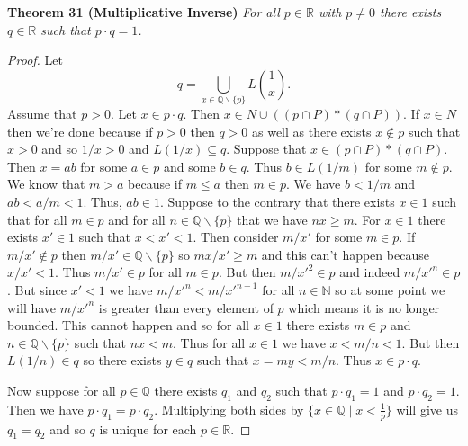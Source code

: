 \documentclass{article}
\begin{document}
\begin{flushleft}
\textbf{Theorem 31 (Multiplicative Inverse)}
\textsl{For all $p \in \mathbb{R}$ with $p \neq 0$ there exists $q \in \mathbb{R}$ such that $p \cdot q = 1$.}
\begin{proof}
Let
\[
q = \bigcup_{x \in \mathbb{Q}\backslash \{p\}} L(\frac{1}{x}).
\]
Assume that $p>0$. Let $x \in p \cdot q$. Then $x \in N \cup ((p \cap P) * (q \cap P))$. If $x \in N$ then we're done because if $p>0$ then $q>0$ as well as there exists $x \notin p$ such that $x>0$ and so $1/x>0$ and $L(1/x) \subseteq q$. Suppose that $x \in (p \cap P) * (q \cap P)$. Then $x=ab$ for some $a \in p$ and some $b \in q$. Thus $b \in L(1/m)$ for some $m \notin p$. We know that $m>a$ because if $m\leq a$ then $m \in p$. We have $b<1/m$ and $ab < a/m < 1$. Thus, $ab \in 1$. Suppose to the contrary that there exists $x \in 1$ such that for all $m \in p$ and for all $n \in \mathbb{Q} \backslash \{p\}$ that we have $nx \geq m$. For $x \in 1$ there exists $x' \in 1$ such that $x < x' < 1$. Then consider $m/x'$ for some $m \in p$. If $m/x' \notin p$ then $m/x' \in \mathbb{Q} \backslash \{p\}$ so $mx/x' \geq m$ and this can't happen because $x/x' < 1$. Thus $m/x' \in p$ for all $m \in p$. But then $m/x'^2 \in p$ and indeed $m/x'^n \in p$. But since $x'<1$ we have $m/x'^n < m/x'^{n+1}$ for all $n \in \mathbb{N}$ so at some point we will have $m/x'^n$ is greater than every element of $p$ which means it is no longer bounded. This cannot happen and so for all $x \in 1$ there exists $m \in p$ and $n \in \mathbb{Q} \backslash \{p\}$ such that $nx < m$. Thus for all $x \in 1$ we have $x < m/n < 1$. But then $L(1/n) \in q$ so there exists $y \in q$ such that $x = my < m/n$. Thus $x \in p \cdot q$.
\newline

Now suppose for all $p \in \mathbb{Q}$ there exists $q_1$ and $q_2$ such that $p \cdot q_1 = 1$ and $p \cdot q_2= 1$. Then we have $p \cdot q_1=p \cdot q_2$. Multiplying both sides by $\{x \in \mathbb{Q} \mid x<\frac{1}{p}\}$ will give us $q_1=q_2$ and so $q$ is unique for each $p \in \mathbb{R}$.
\end{proof}


\end{flushleft}
\end{document}
